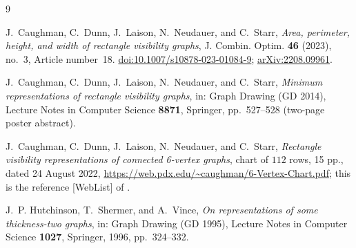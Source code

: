 \documentclass[11pt]{amsart}
\theoremstyle{remark}
\begin{document}
\begin{thebibliography}{9}

J.~Caughman, C.~Dunn, J.~Laison, N.~Neudauer, and C.~Starr,
\emph{Area, perimeter, height, and width of rectangle visibility graphs},
J. Combin. Optim. \textbf{46} (2023), no.~3, Article number~18.
\href{https://doi.org/10.1007/s10878-023-01084-9}{doi:10.1007/s10878-023-01084-9};
\href{https://arxiv.org/abs/2208.09961}{arXiv:2208.09961}.

J.~Caughman, C.~Dunn, J.~Laison, N.~Neudauer, and C.~Starr,
\emph{Minimum representations of rectangle visibility graphs},
in: Graph Drawing (GD 2014), Lecture Notes in Computer Science \textbf{8871},
Springer, pp.~527--528 (two-page poster abstract).

J.~Caughman, C.~Dunn, J.~Laison, N.~Neudauer, and C.~Starr,
\emph{Rectangle visibility representations of connected 6-vertex graphs},
chart of $112$ rows, 15 pp., dated 24 August 2022,
\url{https://web.pdx.edu/~caughman/6-Vertex-Chart.pdf};
this is the reference [WebList] of \cite{CDLNS23}.

J.~P. Hutchinson, T.~Shermer, and A.~Vince,
\emph{On representations of some thickness-two graphs},
in: Graph Drawing (GD 1995), Lecture Notes in Computer Science \textbf{1027},
Springer, 1996, pp.~324--332.

\end{thebibliography}
\end{document}
